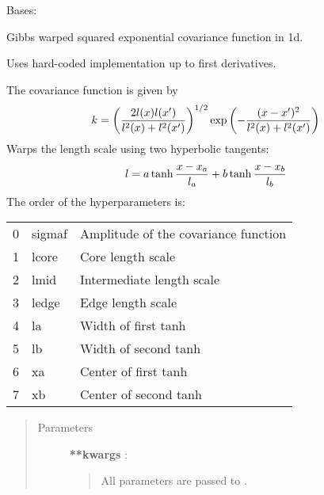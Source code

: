 \documentclass[letterpaper,10pt,english]{sphinxmanual}
\begin{document}
\begin{fulllineitems}
\label{gptools.kernel:gptools.kernel.gibbs.GibbsKernel1dDoubleTanh}
Bases: {\hyperref[gptools.kernel:gptools.kernel.gibbs.GibbsKernel1d]{}}

Gibbs warped squared exponential covariance function in 1d.

Uses hard-coded implementation up to first derivatives.

The covariance function is given by
\begin{gather}
\begin{split}k = \left ( \frac{2l(x)l(x')}{l^2(x)+l^2(x')} \right )^{1/2}\exp\left ( -\frac{(x-x')^2}{l^2(x)+l^2(x')} \right )\end{split}\notag
\end{gather}
Warps the length scale using two hyperbolic tangents:
\begin{gather}
\begin{split}l = a\tanh\frac{x-x_a}{l_a} + b\tanh\frac{x-x_b}{l_b}\end{split}\notag
\end{gather}
The order of the hyperparameters is:

\begin{tabulary}{\linewidth}{|L|L|L|}
\hline

0
 & 
sigmaf
 & 
Amplitude of the covariance function
\\

1
 & 
lcore
 & 
Core length scale
\\

2
 & 
lmid
 & 
Intermediate length scale
\\

3
 & 
ledge
 & 
Edge length scale
\\

4
 & 
la
 & 
Width of first tanh
\\

5
 & 
lb
 & 
Width of second tanh
\\

6
 & 
xa
 & 
Center of first tanh
\\

7
 & 
xb
 & 
Center of second tanh
\\
\hline\end{tabulary}

\begin{quote}\begin{description}
\item[{Parameters}] \leavevmode
\textbf{**kwargs} :
\begin{quote}

All parameters are passed to {\hyperref[gptools.kernel:gptools.kernel.core.Kernel]{}}.
\end{quote}

\end{description}\end{quote}

\end{fulllineitems}
\end{document}

